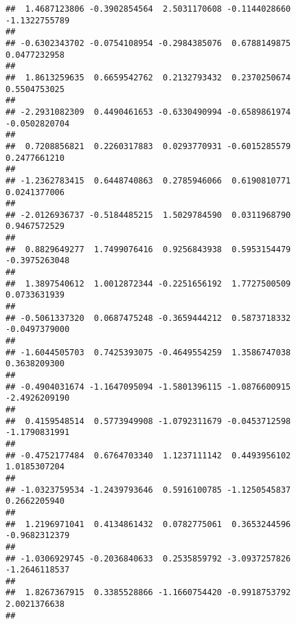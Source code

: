 \documentclass[]{article}
\begin{document}
\begin{verbatim}
##  1.4687123806 -0.3902854564  2.5031170608 -0.1144028660 -1.1322755789 
##                                                                       
## -0.6302343702 -0.0754108954 -0.2984385076  0.6788149875  0.0477232958 
##                                                                       
##  1.8613259635  0.6659542762  0.2132793432  0.2370250674  0.5504753025 
##                                                                       
## -2.2931082309  0.4490461653 -0.6330490994 -0.6589861974 -0.0502820704 
##                                                                       
##  0.7208856821  0.2260317883  0.0293770931 -0.6015285579  0.2477661210 
##                                                                       
## -1.2362783415  0.6448740863  0.2785946066  0.6190810771  0.0241377006 
##                                                                       
## -2.0126936737 -0.5184485215  1.5029784590  0.0311968790  0.9467572529 
##                                                                       
##  0.8829649277  1.7499076416  0.9256843938  0.5953154479 -0.3975263048 
##                                                                       
##  1.3897540612  1.0012872344 -0.2251656192  1.7727500509  0.0733631939 
##                                                                       
## -0.5061337320  0.0687475248 -0.3659444212  0.5873718332 -0.0497379000 
##                                                                       
## -1.6044505703  0.7425393075 -0.4649554259  1.3586747038  0.3638209300 
##                                                                       
## -0.4904031674 -1.1647095094 -1.5801396115 -1.0876600915 -2.4926209190 
##                                                                       
##  0.4159548514  0.5773949908 -1.0792311679 -0.0453712598 -1.1790831991 
##                                                                       
## -0.4752177484  0.6764703340  1.1237111142  0.4493956102  1.0185307204 
##                                                                       
## -1.0323759534 -1.2439793646  0.5916100785 -1.1250545837  0.2662205940 
##                                                                       
##  1.2196971041  0.4134861432  0.0782775061  0.3653244596 -0.9682312379 
##                                                                       
## -1.0306929745 -0.2036840633  0.2535859792 -3.0937257826 -1.2646118537 
##                                                                       
##  1.8267367915  0.3385528866 -1.1660754420 -0.9918753792  2.0021376638 
##                                                                       

\end{verbatim}
\end{document}
